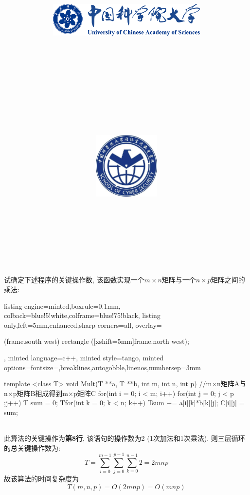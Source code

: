 \documentclass{article}
\title{
	\includegraphics[width=0.6\textwidth]{images/title/ucas_logo 1.pdf}\\
    \vspace{1in}
    \textmd{\textbf{\hmwkClass}}\\
	\textmd{\Large{\textbf{\hmwkClassID}}}\\
    \textmd{\textbf{\hmwkTitle}}\\
    \normalsize\vspace{0.1in}\large{\hmwkCompleteTime }\\
    \vspace{0.1in}\large{\textit{\hmwkClassInstructor\ }}\\
    \vspace{1in}
	\includegraphics[width=0.25\textwidth]{images/title/Cyber.jpg}\\
	\vspace{1in}
}
\author{
	\hmwkAuthorName \\ 
	\hmwkAuthorStuID \\
	\hmwkAuthorInst \\
	\hmwkAuthorzhuanye \\
	\hmwkAuthorfangxiang
	}
\date{}
\begin{document}
\maketitle


%
%
%
%
%


\pagebreak

\begin{homeworkProblem}
	试确定下述程序的关键操作数, 该函数实现一个$m\times n$矩阵与一个$n\times p$矩阵之间的乘法:
	
\begin{tcblisting}{listing engine=minted,boxrule=0.1mm,
	colback=blue!5!white,colframe=blue!75!black,
	listing only,left=5mm,enhanced,sharp corners=all,
	overlay={\begin{tcbclipinterior} (frame.south west)
	rectangle ([xshift=5mm]frame.north west);\end{tcbclipinterior}},
	minted language=c++,
	minted style=tango,
	minted options={fontsize=\normalsize,breaklines,autogobble,linenos,numbersep=3mm}}
    template <class T>
    void Mult(T **a, T **b, int m, int n, int p) {
        //m×n矩阵A与n×p矩阵B相成得到m×p矩阵C
        for(int i = 0; i < m; i++) {
            for(int j = 0; j < p ;j++) {
                T sum = 0;
                Tfor(int k = 0; k < n; k++)
                Tsum += a[i][k]*b[k][j];
                C[i][j] = sum;
            }
        }
    }
\end{tcblisting}
	
	
	\solution
	\\

	此算法的关键操作为\textbf{第8行}, 该语句的操作数为2 (1次加法和1次乘法). 则三层循环的总关键操作数为:$$T=\sum_{i=0}^{m-1}{\sum_{j=0}^{p-1}{\sum_{k=0}^{n-1}{2}}}=2mnp
	$$
	故该算法的时间复杂度为$$T\left( m,n,p \right) =O\left( 2mnp \right) =O\left( mnp \right) $$
	
\end{homeworkProblem}

\pagebreak
\end{document}

